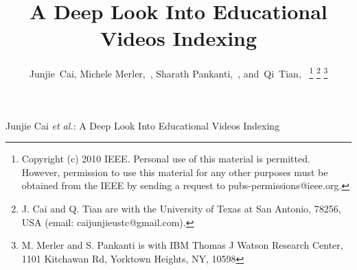 \documentclass[11pt,twocolumn,twoside]{IEEEtran}
\begin{document}
\title{A Deep Look Into Educational Videos Indexing}
\author{Junjie~Cai,
        Michele Merler,~,
        Sharath Pankanti,~,
        and~Qi~Tian,~
\thanks{Copyright (c) 2010 IEEE. Personal use of this material is permitted.
However, permission to use this material for any other purposes must
be obtained from the IEEE by sending a request to pubs-permissions@ieee.org.}%
\thanks{J. Cai and Q. Tian are with the University of Texas at San Antonio, 78256, USA
(email: caijunjieustc@gmail.com).} %
\thanks{M. Merler and S. Pankanti is with IBM Thomas J Watson Research Center, 1101 Kitchawan Rd, Yorktown Heights, NY, 10598}%
}

%
{Junjie Cai \MakeLowercase{\textit{et al.}}: A Deep Look Into Educational Videos Indexing}

\maketitle
\end{document}

